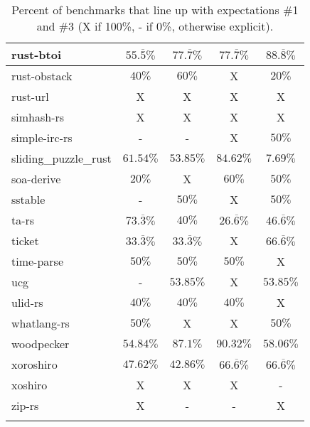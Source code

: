 \documentclass{article}
\begin{document}
\begin{longtable}[h!]{|l|c|c|c|c|}
    rust-btoi & $55.\overline{5}\%$ & $77.\overline{7}\%$ & $77.\overline{7}\%$ & $88.\overline{8}\%$ \\ %
    \hline
    rust-obstack & $40\%$ & $60\%$ & X & $20\%$ \\ %
    \hline
    rust-url & X & X & X & X \\ %
    \hline
    simhash-rs & X & X & X & X \\ %
    \hline
    simple-irc-rs & - & - & X & $50\%$ \\ %
    \hline
    sliding\_puzzle\_rust & $61.54\%$ & $53.85\%$ & $84.62\%$ & $7.69\%$ \\ %
     \hline
    soa-derive & $20\%$ & X & $60\%$ & $50\%$ \\ %
    \hline
    sstable & - & $50\%$ & X & $50\%$ \\ %
     \hline
    ta-rs & $73.\overline{3}\%$ & $40\%$ & $26.\overline{6}\%$ & $46.\overline{6}\%$ \\ %
    \hline
    ticket & $33.\overline{3}\%$ & $33.\overline{3}\%$ & X & $66.\overline{6}\%$ \\ %
    \hline
    time-parse & $50\%$ & $50\%$ & $50\%$ & X \\ %
    \hline
    ucg & - & $53.85\%$ & X & $53.85\%$ \\ %
    \hline
    ulid-rs & $40\%$ & $40\%$ & $40\%$ & X \\ %
    \hline
    whatlang-rs & $50\%$ & X & X & $50\%$ \\ %
     \hline
    woodpecker & $54.84\%$ & $87.1\%$ & $90.32\%$ & $58.06\%$ \\ %
    \hline
    xoroshiro & $47.62\%$ & $42.86\%$ & $66.\overline{6}\%$ & $66.\overline{6}\%$ \\ %
    \hline
    xoshiro & X & X & X & - \\ %
    \hline
    zip-rs & X & - & - & X \\ %
    \hline
  \caption{Percent of benchmarks that line up with expectations \#1 and \#3 (X if 100\%, - if 0\%, otherwise explicit).}
  \label{table:formatting}
\end{longtable}
\end{document}

